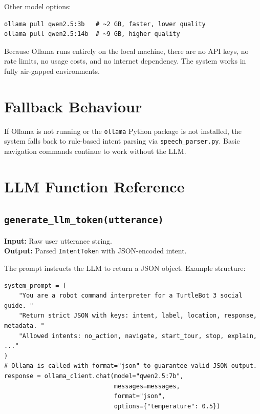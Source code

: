 \documentclass[12pt,a4paper]{report}
\newcommand{\file}[1]{\texttt{\color{black!70}#1}}
\begin{document}
Other model options:

\begin{lstlisting}[style=bashstyle]
ollama pull qwen2.5:3b   # ~2 GB, faster, lower quality
ollama pull qwen2.5:14b  # ~9 GB, higher quality
\end{lstlisting}

\begin{tcolorbox}[notebox, title=No API Keys Required]
  Because Ollama runs entirely on the local machine, there are no API keys,
  no rate limits, no usage costs, and no internet dependency.
  The system works in fully air-gapped environments.
\end{tcolorbox}

\section{Fallback Behaviour}

If Ollama is not running or the \texttt{ollama} Python package is not installed,
the system falls back to rule-based intent parsing via \file{speech\_parser.py}.
Basic navigation commands continue to work without the LLM.

\section{LLM Function Reference}

\subsection{\texttt{generate\_llm\_token(utterance)}}

\textbf{Input:} Raw user utterance string.\\
\textbf{Output:} Parsed \texttt{IntentToken} with JSON-encoded intent.

The prompt instructs the LLM to return a JSON object.  Example structure:

\begin{lstlisting}[style=pythonstyle, caption={Simplified prompt sent to Ollama/Qwen}]
system_prompt = (
    "You are a robot command interpreter for a TurtleBot 3 social guide. "
    "Return strict JSON with keys: intent, label, location, response, metadata. "
    "Allowed intents: no_action, navigate, start_tour, stop, explain, ..."
)
# Ollama is called with format="json" to guarantee valid JSON output.
response = ollama_client.chat(model="qwen2.5:7b",
                              messages=messages,
                              format="json",
                              options={"temperature": 0.5})
\end{lstlisting}
\end{document}

